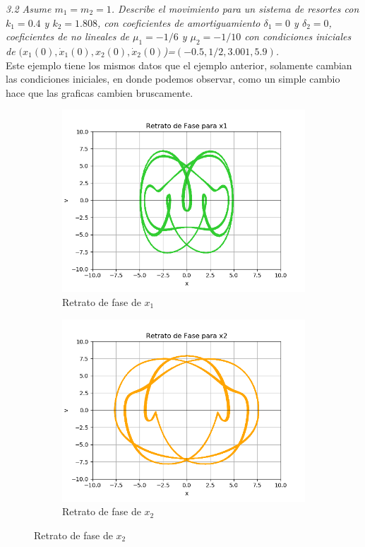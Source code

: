 \documentclass[12pt]{article}
\begin{document}
\pagebreak 

\noindent \textit{3.2 Asume $m_1 = m_2 = 1$. Describe el movimiento para un sistema de resortes con $k_1=0.4$ y $k_2=1.808$, con coeficientes de amortiguamiento $\delta_1=0$ y $\delta_2=0$, coeficientes de no lineales de $\mu_1=-1/6$ y $\mu_2=-1/10$ con condiciones iniciales de $(x_1(0), \dot x_1(0), x_2(0), \dot x_2(0)$)=$(-0.5,1/2,3.001,5.9)$.}\\

Este ejemplo tiene los mismos datos que el ejemplo anterior, solamente cambian las condiciones iniciales, en donde podemos observar, como un simple cambio hace que las graficas cambien bruscamente. 

\begin{figure}[h!]
\begin{subfigure}{.55\textwidth}
  \centering
  \includegraphics[width=.8\linewidth]{Ej3_21.png}
  \caption{Retrato de fase de $x_1$}
  \label{fig:sfig2}
\end{subfigure}
\begin{subfigure}{.55\textwidth}
  \centering
  \includegraphics[width=.8\linewidth]{Ej3_22.png}
  \caption{Retrato de fase de $x_2$}
  \label{fig:sfig2}
\end{subfigure}
\end{figure}
\end{document}
